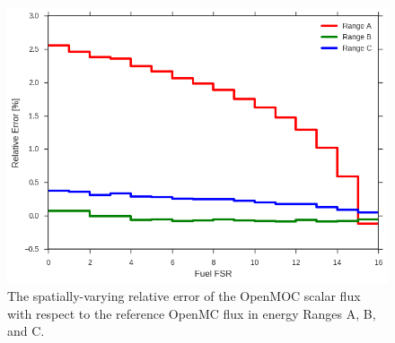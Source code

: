 \begin{figure}[H]
\centering
\includegraphics[width=0.8\linewidth]{figures/rel-err-fuel-fsrs}
\caption{The spatially-varying relative error of the OpenMOC scalar flux with respect to the reference OpenMC flux in energy Ranges A, B, and C.}
\label{fig:rel-err-space}
\end{figure}